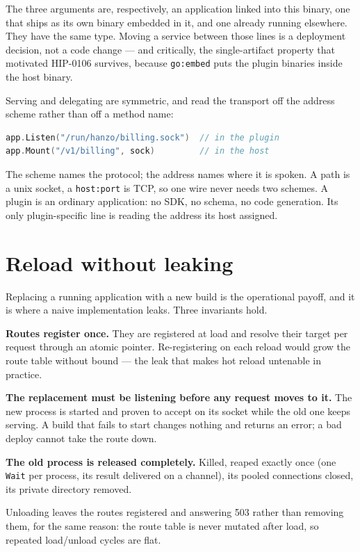 \documentclass[11pt]{article}
\begin{document}
The three arguments are, respectively, an application linked into this binary,
one that ships as its own binary embedded in it, and one already running
elsewhere. They have the same type. Moving a service between those lines is a
deployment decision, not a code change --- and critically, the single-artifact
property that motivated HIP-0106 survives, because \texttt{go:embed} puts the
plugin binaries inside the host binary.

Serving and delegating are symmetric, and read the transport off the address
scheme rather than off a method name:

\begin{lstlisting}[language=Go]
app.Listen("/run/hanzo/billing.sock")  // in the plugin
app.Mount("/v1/billing", sock)         // in the host
\end{lstlisting}

The scheme names the protocol; the address names where it is spoken. A path is
a unix socket, a \texttt{host:port} is TCP, so one wire never needs two schemes.
A plugin is an ordinary application: no SDK, no schema, no code generation. Its
only plugin-specific line is reading the address its host assigned.

\section{Reload without leaking}

Replacing a running application with a new build is the operational payoff, and
it is where a naive implementation leaks. Three invariants hold.

\textbf{Routes register once.} They are registered at load and resolve their
target per request through an atomic pointer. Re-registering on each reload
would grow the route table without bound --- the leak that makes hot reload
untenable in practice.

\textbf{The replacement must be listening before any request moves to it.} The
new process is started and proven to accept on its socket while the old one
keeps serving. A build that fails to start changes nothing and returns an error;
a bad deploy cannot take the route down.

\textbf{The old process is released completely.} Killed, reaped exactly once
(one \texttt{Wait} per process, its result delivered on a channel), its pooled
connections closed, its private directory removed.

Unloading leaves the routes registered and answering 503 rather than removing
them, for the same reason: the route table is never mutated after load, so
repeated load/unload cycles are flat.
\end{document}
